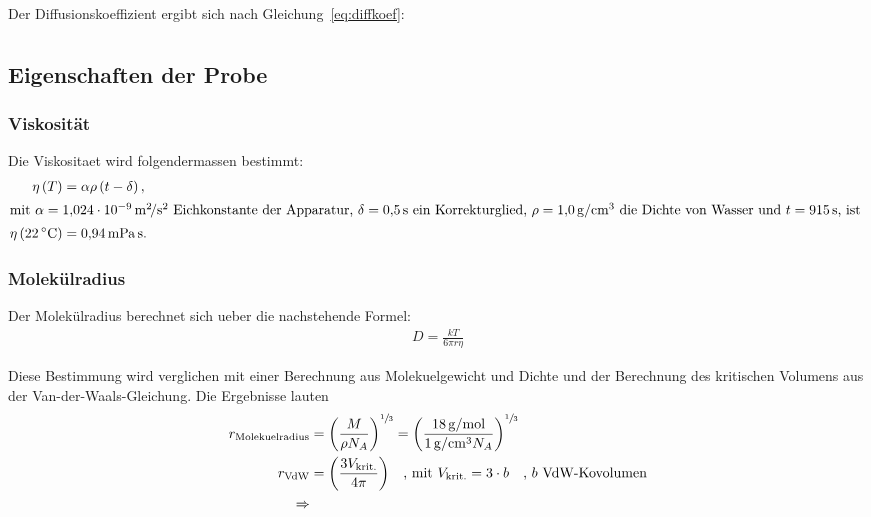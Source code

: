 Der Diffusionskoeffizient ergibt sich nach Gleichung~\eqref{eq:diffkoef}:
\begin{align}%
  \label{eq:d}
  
\end{align}


\subsection{Eigenschaften der Probe}%
\label{sec:eigenschaften_der_probe}

\subsubsection{Viskosität}%
\label{sub:viskositaet}

Die Viskositaet wird folgendermassen bestimmt:
\begin{align}
  \nonumber
  \eta \left(T\right) &= \alpha \rho \left(t - \delta\right), \\
  \intertext{%
    mit $\alpha = \SI[]{1.024e-09}{\meter\squared\per\second\squared}$ Eichkonstante der Apparatur,
    $\delta = \SI[]{0.5}{\second}$ ein Korrekturglied,
    $\rho = \SI[]{1.0}{\gram\per\centi\meter\cubed}$ die Dichte von Wasser
    und $t = \SI{915}{\second}$, ist
  }
  \label{eq:viskositaet}
  \eta \left(\SI{22}{\celsius}\right)&= \SI[]{0.94}{\milli\pascal\second}.
\end{align}

\subsubsection{Molekülradius}%
\label{sub:molekuelradius}
Der Molekülradius berechnet sich ueber die nachstehende Formel:
\begin{align}
  \label{eq:molekuelradius}
  D = \frac{k T}{6 \pi r \eta}
\end{align}

Diese Bestimmung wird verglichen mit einer Berechnung aus Molekuelgewicht und Dichte
und der Berechnung des kritischen Volumens aus der Van-der-Waals-Gleichung.
Die Ergebnisse lauten
\begin{align*}
  r_\text{Molekuelradius} &= {\left(\frac{M}{\rho N_A}\right)}^{\sfrac{1}{3}} =
    {\left(\frac{\SI{18}{\gram\per\mole}}{\SI{1}{\gram\per\centi\meter\tothe3} N_A}\right)}^{\sfrac{1}{3}} \\
    r_\text{VdW} &= {\left(\frac{3 V_\text{krit.}}{4 \pi}\right)}
    \hspace{1em}\text{, mit } V_\text{krit.} = 3 \cdot b \hspace{1em}\text{, $b$ VdW-Kovolumen}\\
  \Rightarrow 
\end{align*}

